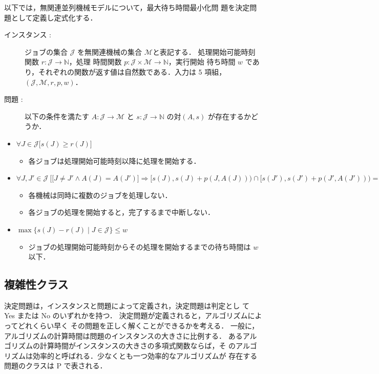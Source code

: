 \documentclass[12pt]{optlab-bachelor}
\begin{document}
以下では，無関連並列機械モデルについて，最大待ち時間最小化問
題を決定問題として定義し定式化する．

\begin{description}

  \item[インスタンス : ] ジョブの集合 $\mathcal{J}$ を無関連機械の集合 $\mathcal{M}$と表記する．
  処理開始可能時刻関数 $r : \mathcal{J} \to \mathbb{N}$，処理
  時間関数 $p : \mathcal{J} \times \mathcal{M} \to \mathbb{N}$，実行開始
  待ち時間 $w$ であり，それぞれの関数が返す値は自然数である．入力は 5 項組，$(\mathcal{J}, \mathcal{M}, r, p, w)$．

  \item[問題 : ] 以下の条件を満たす $A : \mathcal{J} \to \mathcal{M}$ と $s : \mathcal{J} \to \mathbb{N}$ の対$(A,s)$ が存在するかどうか．
\end{description}

\begin{itemize}
  \item $\forall J \in \mathcal{J}\big[s(J) \ge r(J) \big]$
  \begin{itemize}
    \item 各ジョブは処理開始可能時刻以降に処理を開始する．
  \end{itemize}
  \item {\footnotesize $\forall J, J' \in \mathcal{J}\ \Big[ \big[J\ne J' \land A(J) = A(J')\big] \Rightarrow [s(J), s(J)+p(J,A(J))) \cap[s(J'), s(J')+p(J', A(J'))) = \emptyset \Big]$}
  \begin{itemize}
    \item 各機械は同時に複数のジョブを処理しない．
    \item 各ジョブの処理を開始すると，完了するまで中断しない．
  \end{itemize}
  \item $\max\big\{s(J) - r(J) \mid J \in \mathcal{J}\big\} \le w$
  \begin{itemize}
    \item ジョブの処理開始可能時刻からその処理を開始するまでの待ち時間は $w$ 以下．
  \end{itemize}
\end{itemize}

\subsection{複雑性クラス}
決定問題は，インスタンスと問題によって定義され，決定問題は判定とし
て Yes または No のいずれかを持つ．
決定問題が定義されると，アルゴリズムによってどれくらい早く
その問題を正しく解くことができるかを考える．
一般に，アルゴリズムの計算時間は問題のインスタンスの大きさに比例する．
あるアルゴリズムの計算時間がインスタンスの大きさの多項式関数ならば，そ
のアルゴリズムは効率的と呼ばれる．少なくとも一つ効率的なアルゴリズムが
存在する問題のクラスは P で表される．
\end{document}
